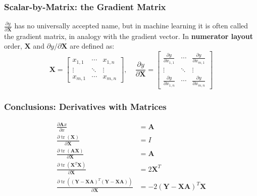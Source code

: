 \documentclass{beamer}
\DeclareMathOperator{\tr}{tr}
\begin{document}
\begin{frame}
  \frametitle{Scalar-by-Matrix: the Gradient Matrix}

  $\frac{\partial y}{\partial\mathbf{X}}$ has no universally accepted
  name, but in machine learning it is often called the gradient
  matrix, in analogy with the gradient vector.  In {\bf numerator
    layout} order, $\mathbf{X}$ and $\partial y/\partial\mathbf{X}$
  are defined as:
  \begin{displaymath}
    \mathbf{X}=
    \left[\begin{array}{ccc}
        x_{1,1}&\cdots&x_{1,n}\\
        \vdots&\ddots&\vdots\\
        x_{m,1}&\cdots&x_{m,n}
      \end{array}\right],~~~~~
    \frac{\partial y}{\partial\mathbf{X}}=
    \left[\begin{array}{ccc}
        \frac{\partial y}{\partial x_{1,1}}&\cdots&\frac{\partial y}{\partial x_{m,1}}\\
        \vdots&\ddots&\vdots\\
        \frac{\partial y}{\partial x_{1,n}}&\cdots&\frac{\partial y}{\partial x_{m,n}}
      \end{array}\right]
  \end{displaymath}
\end{frame}

\begin{frame}
  \frametitle{Conclusions: Derivatives with Matrices}
  \begin{align*}
    \frac{\partial \mathbf{A}x}{\partial x} &= \mathbf{A}\\
    \frac{\partial\tr(\mathbf{X})}{\partial\mathbf{X}} &= I\\
    \frac{\partial\tr(\mathbf{A}\mathbf{X})}{\partial\mathbf{X}} &= \mathbf{A}\\
    \frac{\partial\tr(\mathbf{X}^T\mathbf{X})}{\partial\mathbf{X}} &=2\mathbf{X}^T\\
    \frac{\partial\tr((\mathbf{Y}-\mathbf{X}\mathbf{A})^T(\mathbf{Y}-\mathbf{X}\mathbf{A}))}{\partial\mathbf{X}}
    &=
    -2\left(\mathbf{Y}-\mathbf{X}\mathbf{A}\right)^T\mathbf{X}
  \end{align*}    
\end{frame}
\end{document}
